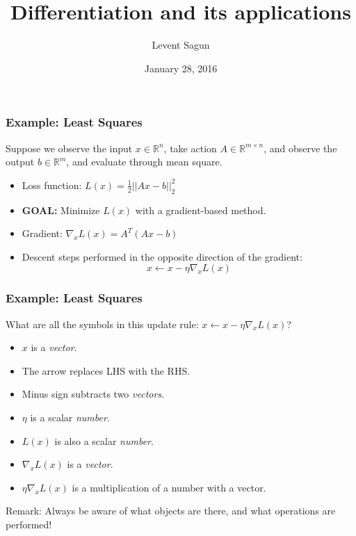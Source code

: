 \documentclass{beamer}
\title{Differentiation and its applications}
\author{Levent Sagun}
\institute{New York University}
\date{January 28, 2016}
\begin{document}

\frame{\titlepage}


\begin{frame}
\frametitle{Example: Least Squares}
Suppose we observe the input $x\in \mathbb{R}^n$, take action $A\in \mathbb{R}^{m \times n}$, and observe the output $b\in \mathbb{R}^m$, and evaluate through mean square.

\begin{itemize}
    \item<1-> Loss function: $L(x) = \frac{1}{2}||Ax-b||_2^2 $
    \item<1-> \textbf{GOAL:} Minimize $L(x)$ with a gradient-based method.
    \item<2-> Gradient: $\nabla_xL(x) = A^T(Ax-b)$
    \item<2-> Descent steps performed in the opposite direction of the gradient: \[x \leftarrow x - \eta \nabla_xL(x)\]
\end{itemize}
\end{frame}


\begin{frame}
\frametitle{Example: Least Squares}
What are all the symbols in this update rule: $x \leftarrow x - \eta \nabla_xL(x)$?
\begin{itemize}
    \item<2-> $x$ is a \textit{vector}.
    \item<2-> The arrow replaces LHS with the RHS.
    \item<2-> Minus sign subtracts two \textit{vectors}.
    \item<2-> $\eta$ is a scalar \textit{number}.
    \item<2-> $L(x)$ is also a scalar \textit{number}.
    \item<2-> $\nabla_xL(x)$ is a \textit{vector}.
    \item<2-> $\eta \nabla_xL(x)$ is a multiplication of a number with a vector.
\end{itemize}
\begin{block}{}
Remark: Always be aware of what objects are there, and what operations are performed!
\end{block}
\end{frame}

\end{document}
